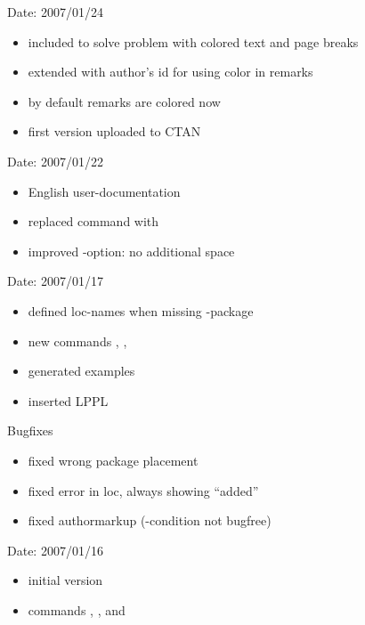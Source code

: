 
Date: 2007/01/24
\begin{itemize}
	\item included  to solve problem with colored text and page breaks
	\item extended  with author's id for using color in remarks
	\item by default remarks are colored now
	\item first version uploaded to CTAN
\end{itemize}


Date: 2007/01/22
\begin{itemize}
	\item English user-documentation
	\item replaced command  with 
	\item improved -option: no additional space
\end{itemize}


Date: 2007/01/17
\begin{itemize}
	\item defined loc-names when missing -package
	\item new commands , , 
	\item generated examples
	\item inserted LPPL
\end{itemize}
Bugfixes
\begin{itemize}
	\item fixed wrong  package placement
	\item fixed error in loc, always showing ``added''
	\item fixed authormarkup (-condition not bugfree)
\end{itemize}


Date: 2007/01/16
\begin{itemize}
	\item initial version
	\item commands , , and 
\end{itemize}



